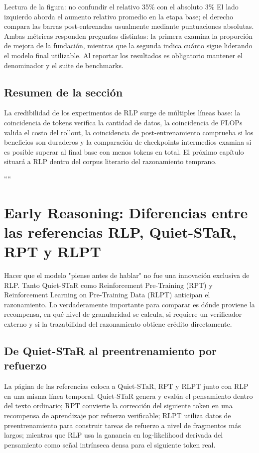 \documentclass[a4paper]{article}
\begin{document}
\begin{knowledgebox}{Lectura de la figura: no confundir el relativo 35\% con el absoluto 3\%}
El lado izquierdo aborda el aumento relativo promedio en la etapa base; el derecho compara las barras post-entrenadas usualmente mediante puntuaciones absolutas. Ambas métricas responden preguntas distintas: la primera examina la proporción de mejora de la fundación, mientras que la segunda indica cuánto sigue liderando el modelo final utilizable. Al reportar los resultados es obligatorio mantener el denominador y el suite de benchmarks.
\end{knowledgebox}

\subsection{Resumen de la sección}

La credibilidad de los experimentos de RLP surge de múltiples líneas base: la coincidencia de tokens verifica la cantidad de datos, la coincidencia de FLOPs valida el costo del rollout, la coincidencia de post-entrenamiento comprueba si los beneficios son duraderos y la comparación de checkpoints intermedios examina si es posible superar al final base con menos tokens en total. El próximo capítulo situará a RLP dentro del corpus literario del razonamiento temprano.

````
\section{Early Reasoning: Diferencias entre las referencias RLP, Quiet-STaR, RPT y RLPT}

Hacer que el modelo "piense antes de hablar" no fue una innovación exclusiva de RLP. Tanto Quiet-STaR como Reinforcement Pre-Training (RPT) y Reinforcement Learning on Pre-Training Data (RLPT) anticipan el razonamiento. Lo verdaderamente importante para comparar es dónde proviene la recompensa, en qué nivel de granularidad se calcula, si requiere un verificador externo y si la trazabilidad del razonamiento obtiene crédito directamente.

\subsection{De Quiet-STaR al preentrenamiento por refuerzo}

La página de las referencias coloca a Quiet-STaR, RPT y RLPT junto con RLP en una misma línea temporal. Quiet-STaR genera y evalúa el pensamiento dentro del texto ordinario; RPT convierte la corrección del siguiente token en una recompensa de aprendizaje por refuerzo verificable; RLPT utiliza datos de preentrenamiento para construir tareas de refuerzo a nivel de fragmentos más largos; mientras que RLP usa la ganancia en log-likelihood derivada del pensamiento como señal intrínseca densa para el siguiente token real.
\end{document}
